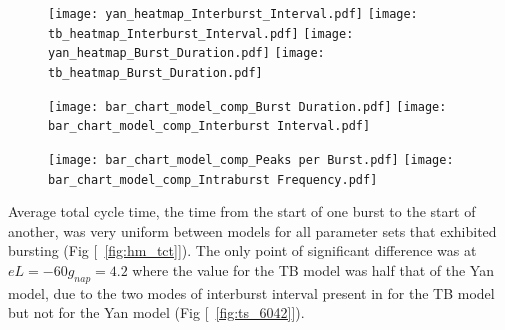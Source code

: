 \documentclass[11pt]{article}
\begin{document}
\begin{figure}[h]
	\centering
	\texttt{[image: yan\_heatmap\_Interburst\_Interval.pdf]}
	\texttt{[image: tb\_heatmap\_Interburst\_Interval.pdf]}
	\texttt{[image: yan\_heatmap\_Burst\_Duration.pdf]}
	\texttt{[image: tb\_heatmap\_Burst\_Duration.pdf]}
\end{figure}

\begin{figure}[h]
\texttt{[image: bar\_chart\_model\_comp\_Burst Duration.pdf]}
\texttt{[image: bar\_chart\_model\_comp\_Interburst Interval.pdf]}
\end{figure}

\begin{figure}[h]
\texttt{[image: bar\_chart\_model\_comp\_Peaks per Burst.pdf]}
\texttt{[image: bar\_chart\_model\_comp\_Intraburst Frequency.pdf]}
\end{figure}

Average total cycle time, the time from the start of one burst to the start of another, was very uniform between models for all parameter sets that exhibited bursting (Fig [~\ref{fig:hm_tct}]). The only point of significant difference was at $eL=-60 g_{nap} = 4.2$ where the value for the TB model was half that of the Yan model, due to the two modes of interburst interval present in for the TB model but not for the Yan model (Fig [~\ref{fig:ts_6042}]).
\end{document}
